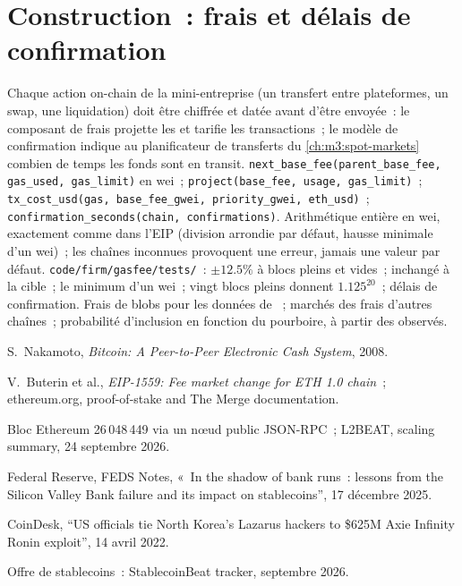 \section{Construction~: frais et délais de confirmation}\label{bld:m3:blockchains-for-traders:gasfee}

\begin{build}
 Chaque action on-chain de la mini-entreprise (un transfert entre plateformes, un swap, une liquidation)
doit être chiffrée et datée avant d'être envoyée~: le composant de frais projette les  et tarifie les transactions~; le
modèle de confirmation indique au planificateur de transferts du \cref{ch:m3:spot-markets} combien de temps les fonds sont en transit.
 \texttt{next\_base\_fee(parent\_base\_fee, gas\_used, gas\_limit)} en wei~;
\texttt{project(base\_fee, usage, gas\_limit)}~; \texttt{tx\_cost\_usd(gas, base\_fee\_gwei, priority\_gwei,
eth\_usd)}~; \texttt{confirmation\_seconds(chain, confirmations)}.
 Arithmétique entière en wei, exactement comme dans l'EIP (division arrondie par défaut, hausse minimale d'un wei)~;
les chaînes inconnues provoquent une erreur, jamais une valeur par défaut.
 \texttt{code/firm/gasfee/tests/}~: $\pm12.5\%$ à blocs pleins et vides~; inchangé
à la cible~; le minimum d'un wei~; vingt blocs pleins donnent $1.125^{20}$~; délais de confirmation.
 Frais de blobs pour les données de ~; marchés des frais d'autres chaînes~; probabilité d'inclusion en fonction du
pourboire, à partir des  observés.
\end{build}

\begin{omsources}
\item S.~Nakamoto, \emph{Bitcoin: A Peer-to-Peer Electronic Cash System}, 2008.
\item V.~Buterin et al., \emph{EIP-1559: Fee market change for ETH 1.0 chain}~; ethereum.org, proof-of-stake and The
Merge documentation.
\item Bloc Ethereum 26\,048\,449 via un nœud public JSON-RPC~; L2BEAT, scaling summary, 24 septembre 2026.
\item Federal Reserve, FEDS Notes, «~In the shadow of bank runs~: lessons from the Silicon Valley Bank failure and its
impact on stablecoins'', 17 décembre 2025.
\item CoinDesk, ``US officials tie North Korea's Lazarus hackers to \$625M Axie Infinity Ronin exploit'', 14 avril
2022.
\item Offre de stablecoins~: StablecoinBeat tracker, septembre 2026.
\end{omsources}


